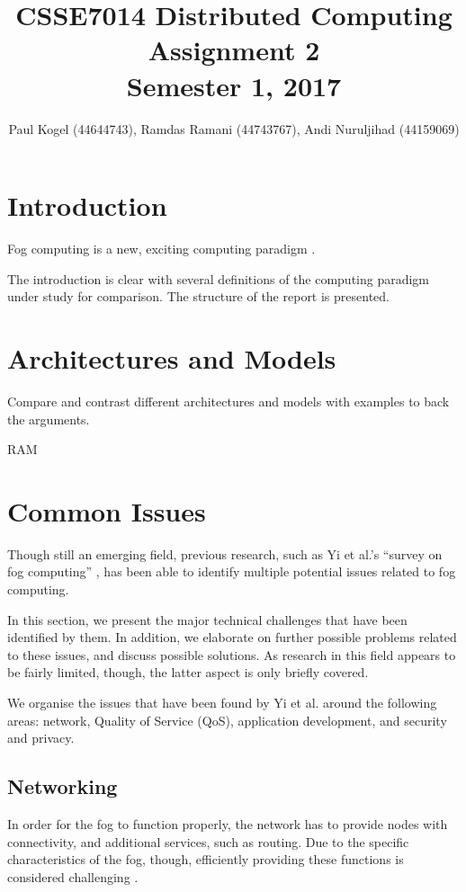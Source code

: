\documentclass{article}
\title{CSSE7014 Distributed Computing \\
Assignment 2 \\
Semester 1, 2017}
\author{Paul Kogel (44644743), Ramdas Ramani (44743767), Andi Nuruljihad (44159069)}
\begin{document}
\maketitle

\pagebreak
\tableofcontents\thispagestyle{plain}

\pagebreak

\section{Introduction}

Fog computing is a new, exciting computing paradigm \cite{bonomi2012fog}.

The introduction is clear with several definitions of the computing paradigm under study for comparison. The structure of the report is presented.

\section{Architectures and Models}
Compare and contrast different architectures and models with examples to back the arguments.

RAM


\section{Common Issues}
Though still an emerging field, previous research, such as Yi et al.'s ``survey on fog computing'' \cite{yi2015survey}, has been able to identify multiple potential issues related to fog computing.

In this section, we present the major technical challenges that have been identified by them. In addition, we elaborate on further possible problems related to these issues, and discuss possible solutions. As research in this field appears to be fairly limited, though, the latter aspect is only briefly covered.

We organise the issues that have been found by Yi et al. around the following areas: network, Quality of Service (QoS), application development, and security and privacy.

\subsection{Networking}
In order for the fog to function properly, the network has to provide nodes with connectivity, and additional services, such as routing. Due to the specific characteristics of the fog, though, efficiently providing these functions is considered challenging \cite{yi2015survey}.
\end{document}
